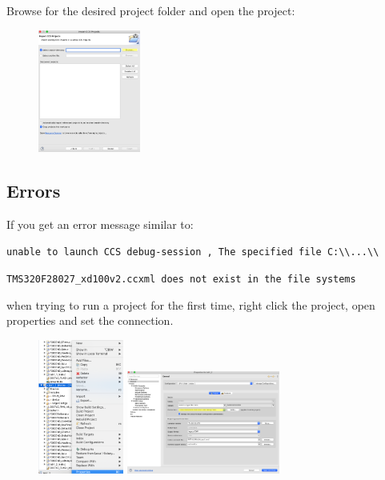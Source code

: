 \documentclass{article}
\begin{document}
Browse for the desired project folder and open the project:

\begin{figure}[H]
    \centering
  \includegraphics[width = 0.3\textwidth]{ccs_projects_3} 
\end{figure}

\pagebreak

\subsection{Errors}

If you get an error message similar to:

\verb|unable to launch CCS debug-session , The specified file C:\\...\\|

\verb|TMS320F28027_xd100v2.ccxml does not exist in the file systems|

when trying to run a project for the first time, right click the project, open properties and set the connection.

\begin{figure}[H]
    \centering
  \includegraphics[width = 0.25\textwidth]{ccs_errors_1.png}
  \qquad
  \includegraphics[width = 0.45\textwidth]{ccs_errors_2.png}
\end{figure}
\end{document}
